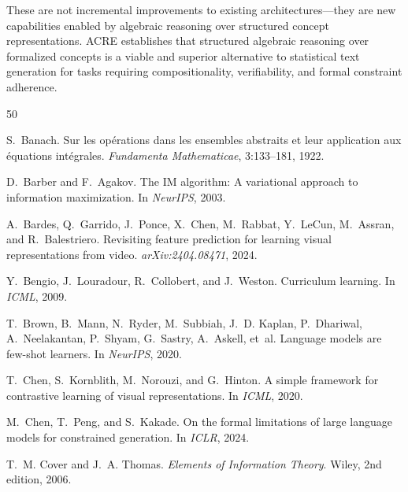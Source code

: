 \documentclass{article}
\begin{document}
These are not incremental improvements to existing architectures---they are new capabilities enabled by algebraic reasoning over structured concept representations. ACRE establishes that structured algebraic reasoning over formalized concepts is a viable and superior alternative to statistical text generation for tasks requiring compositionality, verifiability, and formal constraint adherence.



\begin{thebibliography}{50}

S.~Banach.
\newblock Sur les op\'{e}rations dans les ensembles abstraits et leur
  application aux \'{e}quations int\'{e}grales.
\newblock \emph{Fundamenta Mathematicae}, 3:133--181, 1922.

D.~Barber and F.~Agakov.
\newblock The {IM} algorithm: A variational approach to information maximization.
\newblock In \emph{NeurIPS}, 2003.

A.~Bardes, Q.~Garrido, J.~Ponce, X.~Chen, M.~Rabbat, Y.~LeCun, M.~Assran,
  and R.~Balestriero.
\newblock Revisiting feature prediction for learning visual representations
  from video.
\newblock \emph{arXiv:2404.08471}, 2024.

Y.~Bengio, J.~Louradour, R.~Collobert, and J.~Weston.
\newblock Curriculum learning.
\newblock In \emph{ICML}, 2009.

T.~Brown, B.~Mann, N.~Ryder, M.~Subbiah, J.~D. Kaplan, P.~Dhariwal,
  A.~Neelakantan, P.~Shyam, G.~Sastry, A.~Askell, et~al.
\newblock Language models are few-shot learners.
\newblock In \emph{NeurIPS}, 2020.

T.~Chen, S.~Kornblith, M.~Norouzi, and G.~Hinton.
\newblock A simple framework for contrastive learning of visual
  representations.
\newblock In \emph{ICML}, 2020.

M.~Chen, T.~Peng, and S.~Kakade.
\newblock On the formal limitations of large language models for constrained
  generation.
\newblock In \emph{ICLR}, 2024.

T.~M. Cover and J.~A. Thomas.
\newblock \emph{Elements of Information Theory}.
\newblock Wiley, 2nd edition, 2006.


\end{thebibliography}
\end{document}
